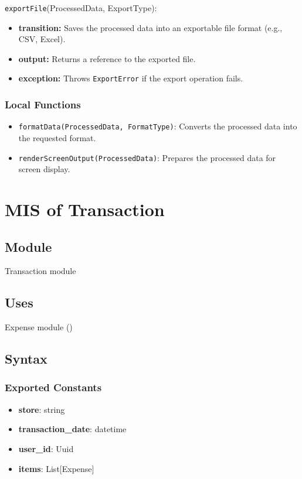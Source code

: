 \documentclass[12pt, titlepage]{article}
\begin{document}
\noindent \texttt{exportFile}(ProcessedData, ExportType):
\begin{itemize}
    \item \textbf{transition:} Saves the processed data into an exportable file format (e.g., CSV, Excel).
    \item \textbf{output:} Returns a reference to the exported file.
    \item \textbf{exception:} Throws \texttt{ExportError} if the export operation fails.
\end{itemize}

\subsubsection{Local Functions}

\begin{itemize}
    \item \texttt{formatData(ProcessedData, FormatType)}: Converts the processed data into the requested format.
    \item \texttt{renderScreenOutput(ProcessedData)}: Prepares the processed data for screen display.
\end{itemize}

\newpage

\section{MIS of Transaction}\label{transaction_module}

\subsection{Module}

Transaction module

\subsection{Uses}
Expense module ()\\

\subsection{Syntax}

\subsubsection{Exported Constants}
\begin{itemize}
  \item \textbf{store}: string
  \item \textbf{transaction\_date}: datetime
  \item \textbf{user\_id}: Uuid
  \item \textbf{items}: List[Expense]
\end{itemize}
\end{document}
